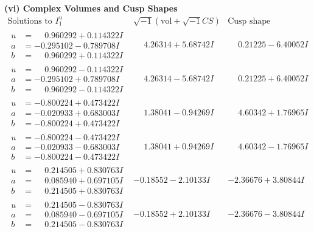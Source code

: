 \documentclass[1p]{elsarticle_modified}
\theoremstyle{definition}
\newcommand{\I}{\sqrt{-1}}
\begin{document}
\newpage\flushleft \textbf{(vi) Complex Volumes and Cusp Shapes}
$$\begin{array}{c|c|c}  
\text{Solutions to }I^u_{1}& \I (\text{vol} + \sqrt{-1}CS) & \text{Cusp shape}\\
 \hline 
\begin{aligned}
u &= \phantom{-}0.960292 + 0.114322 I \\
a &= -0.295102 - 0.789708 I \\
b &= \phantom{-}0.960292 + 0.114322 I\end{aligned}
 & \phantom{-}4.26314 + 5.68742 I & \phantom{-}0.21225 - 6.40052 I \\ \hline\begin{aligned}
u &= \phantom{-}0.960292 - 0.114322 I \\
a &= -0.295102 + 0.789708 I \\
b &= \phantom{-}0.960292 - 0.114322 I\end{aligned}
 & \phantom{-}4.26314 - 5.68742 I & \phantom{-}0.21225 + 6.40052 I \\ \hline\begin{aligned}
u &= -0.800224 + 0.473422 I \\
a &= -0.020933 + 0.683003 I \\
b &= -0.800224 + 0.473422 I\end{aligned}
 & \phantom{-}1.38041 - 0.94269 I & \phantom{-}4.60342 + 1.76965 I \\ \hline\begin{aligned}
u &= -0.800224 - 0.473422 I \\
a &= -0.020933 - 0.683003 I \\
b &= -0.800224 - 0.473422 I\end{aligned}
 & \phantom{-}1.38041 + 0.94269 I & \phantom{-}4.60342 - 1.76965 I \\ \hline\begin{aligned}
u &= \phantom{-}0.214505 + 0.830763 I \\
a &= \phantom{-}0.085940 + 0.697105 I \\
b &= \phantom{-}0.214505 + 0.830763 I\end{aligned}
 & -0.18552 - 2.10133 I & -2.36676 + 3.80844 I \\ \hline\begin{aligned}
u &= \phantom{-}0.214505 - 0.830763 I \\
a &= \phantom{-}0.085940 - 0.697105 I \\
b &= \phantom{-}0.214505 - 0.830763 I\end{aligned}
 & -0.18552 + 2.10133 I & -2.36676 - 3.80844 I \\ \hline\begin{aligned}

\end{aligned}
\end{array}$$
\end{document}
